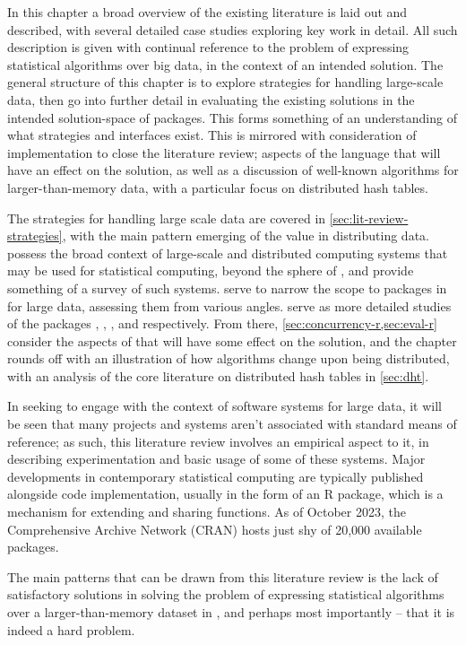 In this chapter a broad overview of the existing literature is laid out and described, with several detailed case studies exploring key work in detail.
All such description is given with continual reference to the problem of expressing statistical algorithms over big data, in the context of an intended \lsr{} solution.
The general structure of this chapter is to explore strategies for handling large-scale data, then go into further detail in evaluating the existing solutions in the intended solution-space of \R{} packages.
This forms something of an understanding of what strategies and interfaces exist.
This is mirrored with consideration of implementation to close the literature review; aspects of the \R{} language that will have an effect on the solution, as well as a discussion of well-known algorithms for larger-than-memory data, with a particular focus on distributed hash tables.

The strategies for handling large scale data are covered in \cref{sec:lit-review-strategies}, with the main pattern emerging of the value in distributing data.
 possess the broad context of large-scale and distributed computing systems that may be used for statistical computing, beyond the sphere of \R{}, and provide something of a survey of such systems.
 serve to narrow the scope to packages in \R{} for large data, assessing them from various angles.
 serve as more detailed studies of the \R{} packages , , , and  respectively.
From there, \cref{sec:concurrency-r,sec:eval-r} consider the aspects of \R{} that will have some effect on the solution, and the chapter rounds off with an illustration of how algorithms change upon being distributed, with an analysis of the core literature on distributed hash tables in \cref{sec:dht}.

In seeking to engage with the context of software systems for large data, it will be seen that many projects and systems aren't associated with standard means of reference; as such, this literature review involves an empirical aspect to it, in describing experimentation and basic usage of some of these systems.
Major developments in contemporary statistical computing are typically published alongside \R{} code implementation, usually in the form of an R package, which is a mechanism for extending \R{} and sharing functions.
As of October 2023, the Comprehensive \R{} Archive Network (CRAN) hosts just shy of 20,000 available packages\cite{team20:_r}.

The main patterns that can be drawn from this literature review is the lack of satisfactory solutions in solving the problem of expressing statistical algorithms over a larger-than-memory dataset in \R{}, and perhaps most importantly -- that it is indeed a hard problem.
